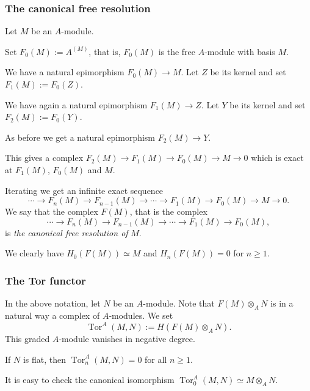 \documentclass[parskip=half,fontsize=12pt]{scrartcl}%
\newcommand{\Tor}{\operatorname{Tor}}
\begin{document}

\subsubsection{The canonical free resolution}

Let $M$ be an $A$-module. 

Set $F_0(M):=A^{(M)}$, that is, $F_0(M)$ is the free $A$-module with basis $M$. 

We have a natural epimorphism $F_0(M)\to M$. Let $Z$ be its kernel and set $F_1(M):=F_0(Z)$. 

We have again a natural epimorphism $F_1(M)\to Z$. Let $Y$ be its kernel and set $F_2(M):=F_0(Y)$. 

As before we get a natural epimorphism $F_2(M)\to Y$. 

This gives a complex $F_2(M)\to F_1(M)\to F_0(M)\to M\to0$ which is exact at $F_1(M)$, $F_0(M)$ and $M$. 

Iterating we get an infinite exact sequence  
$$
\cdots\to F_n(M)\to F_{n-1}(M)\to\cdots\to F_1(M)\to F_0(M)\to M\to0.
$$ 
We say that the complex $F(M)$, that is the complex 
$$
\cdots\to F_n(M)\to F_{n-1}(M)\to\cdots\to F_1(M)\to F_0(M),
$$ 
is \emph{the canonical free resolution of} $M$. 

We clearly have $H_0(F(M))\simeq M$ and $H_n(F(M))=0$ for $n\ge1$.

\subsubsection{The Tor functor}

In the above notation, let $N$ be an $A$-module. Note that $F(M)\otimes_AN$ is in a natural way a complex of $A$-modules. We set 
$$
\Tor^A(M,N):=H(F(M)\otimes_AN).
$$ 
This graded $A$-module vanishes in negative degree. 

If $N$ is flat, then $\Tor^A_n(M,N)=0$ for all $n\ge1$.

It is easy to check the canonical isomorphism $\Tor^A_0(M,N)\simeq M\otimes_AN$.
\end{document}
